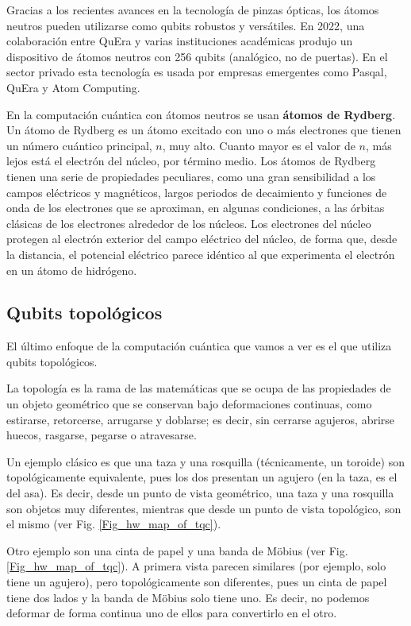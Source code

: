 Gracias a los recientes avances en la tecnología de pinzas ópticas, los átomos neutros pueden utilizarse como qubits robustos y versátiles. En 2022, una colaboración entre QuEra y varias instituciones académicas produjo un dispositivo de átomos neutros con 256 qubits \cite{bib_hw_QuEra_aquila} (analógico, no de puertas). En el sector privado esta tecnología es usada por empresas emergentes como Pasqal, QuEra y Atom Computing. 

En la computación cuántica con átomos neutros se usan \textbf{átomos de Rydberg}. Un átomo de Rydberg es un átomo excitado con uno o más electrones que tienen un número cuántico principal, $n$, muy alto. Cuanto mayor es el valor de $n$, más lejos está el electrón del núcleo, por término medio. Los átomos de Rydberg tienen una serie de propiedades peculiares, como una gran sensibilidad a los campos eléctricos y magnéticos, largos periodos de decaimiento y funciones de onda de los electrones que se aproximan, en algunas condiciones, a las órbitas clásicas de los electrones alrededor de los núcleos. Los electrones del núcleo protegen al electrón exterior del campo eléctrico del núcleo, de forma que, desde la distancia, el potencial eléctrico parece idéntico al que experimenta el electrón en un átomo de hidrógeno.

		\subsection{Qubits topológicos}

El último enfoque de la computación cuántica que vamos a ver es el que utiliza qubits topológicos. 

La topología es la rama de las matemáticas que se ocupa de las propiedades de un objeto geométrico que se conservan bajo deformaciones continuas, como estirarse, retorcerse, arrugarse y doblarse; es decir, sin cerrarse agujeros, abrirse huecos, rasgarse, pegarse o atravesarse. 

Un ejemplo clásico es que una taza y una rosquilla (técnicamente, un toroide) son topológicamente equivalente, pues los dos presentan un agujero (en la taza, es el del asa). Es decir, desde un punto de vista geométrico, una taza y una rosquilla son objetos muy diferentes, mientras que desde un punto de vista topológico, son el mismo (ver Fig. \ref{Fig_hw_map_of_tqc}).

Otro ejemplo son una cinta de papel y una banda de Möbius (ver Fig. \ref{Fig_hw_map_of_tqc}). A primera vista parecen similares (por ejemplo, solo tiene un agujero), pero topológicamente son diferentes, pues un cinta de papel tiene dos lados y la banda de Möbius solo tiene uno. Es decir, no podemos deformar de forma continua uno de ellos para convertirlo en el otro.

